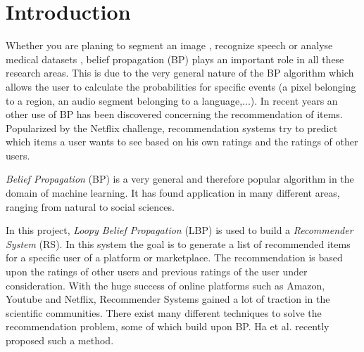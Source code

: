 
\section{Introduction}\label{sec:intro}

Whether you are planing to segment an image \cite{1544822}, recognize speech \cite{5373446} or analyse medical datasets \cite{bailly2011finding}, belief propagation (BP) plays an important role in all these research areas. This is due to the very general nature of the BP algorithm which allows the user to calculate the probabilities for specific events (a pixel belonging to a region, an audio segment belonging to a language,...). In recent years an other use of BP has been discovered concerning the recommendation of items. Popularized by the Netflix challenge, recommendation systems try to predict which items a user wants to see based on his own ratings and the ratings of other users.





\textit{Belief Propagation} (BP) is a very general and therefore popular algorithm in the domain of machine learning. It has found application in many different areas, ranging from natural to social sciences. 

In this project, \textit{Loopy Belief Propagation} (LBP) is used to build a \textit{Recommender System} (RS). In this system the goal is to generate a list of recommended items for a specific user of a platform or marketplace. The recommendation is based upon the ratings of other users and previous ratings of the user under consideration. With the huge success of online platforms such as Amazon, Youtube and Netflix, Recommender Systems gained a lot of traction in the scientific communities. There exist many different techniques to solve the recommendation problem, some of which build upon BP. Ha et al. \cite{Ha:2012:TRT:2396761.2398636} recently proposed such a method. 

